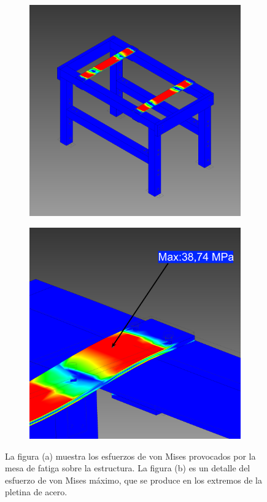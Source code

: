 \begin{figure}[h]
\centering
	\begin{subfigure}{0.49\linewidth}
		\centering
		\includegraphics[width=1\linewidth]{Imagenes/rmesa_gen.png}
		\caption{}\label{fig:rmesa_gen}
	\end{subfigure}%
	\begin{subfigure}{0.49\linewidth}
		\centering
		\includegraphics[width=1\linewidth]{Imagenes/rmesa_det.png}
		\caption{}\label{fig:rmesa_det}
	\end{subfigure}
\caption{La figura (a) muestra los esfuerzos de von Mises provocados por la mesa de fatiga sobre la estructura. La figura (b) es un detalle del esfuerzo de von Mises máximo, que se produce en los extremos de la pletina de acero.}
\label{fig:resultados_mesa}
\end{figure}
